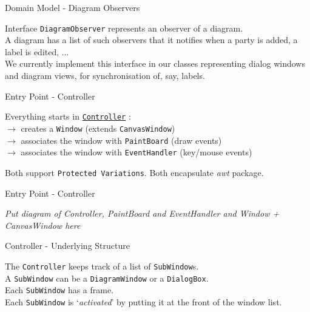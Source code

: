\documentclass[10pt]{beamer}
\begin{document}
\begin{frame}[fragile]{Domain Model - Diagram Observers}
	\begin{center}
	Interface \texttt{DiagramObserver} represents an observer of a diagram. \\
	\vspace{0.5cm}
	A diagram has a list of such observers that it notifies when a party is added, a label is edited, ...\\
	\vspace{0.5cm}
	\small We currently implement this interface in our classes representing dialog windows and diagram views, for synchronisation of, say, labels.
	\end{center}
\end{frame}

\begin{frame}[fragile]{Entry Point - Controller}
	\begin{center}
	Everything starts in \underline{\texttt{Controller}} :
	\vspace{0.5cm}
	\\$\rightarrow$ creates a \texttt{Window} (extends \texttt{CanvasWindow})
	\\$\rightarrow$ associates the window with \texttt{PaintBoard} (draw events)
	\\$\rightarrow$ associates the window with \texttt{EventHandler} (key/mouse events)
	
	\vspace{0.5cm} Both support \texttt{Protected Variations}. Both encapsulate \textit{awt} package.
	\end{center}
\end{frame}

\begin{frame}[fragile]{Entry Point - Controller}
	\begin{center}
	\textit{Put diagram of Controller, PaintBoard and EventHandler and Window + CanvasWindow here}
	\end{center}
\end{frame}

\begin{frame}[fragile]{Controller - Underlying Structure}
	\begin{center}
	The \texttt{Controller} keeps track of a list of \texttt{SubWindow}s.
	\\\vspace{0.5cm} A \texttt{SubWindow} can be a \texttt{DiagramWindow} or a \texttt{DialogBox}.
	\\\vspace{0.5cm} Each \texttt{SubWindow} has a frame.
	\\\vspace{0.5cm} Each \texttt{SubWindow} is `\textit{activated}' by putting it at the front of the window list.
	\end{center}
\end{frame}
\end{document}
